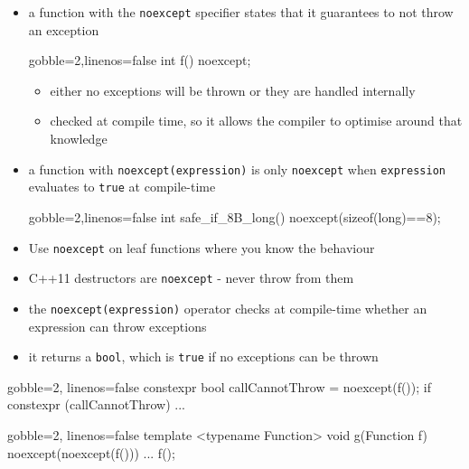 \begin{frame}[fragile]
  \begin{block}{}
    \begin{itemize}
      \item a function with the \texttt{noexcept} specifier states that it guarantees to not throw an exception
      \begin{cppcode*}{gobble=2,linenos=false}
        int f() noexcept;
      \end{cppcode*}
      \begin{itemize}
        \item either no exceptions will be thrown or they are handled internally
        \item checked at compile time, so it allows the compiler to optimise around that knowledge
      \end{itemize}
      \item a function with \texttt{noexcept(expression)} is only \texttt{noexcept} when \texttt{expression} evaluates to \texttt{true} at compile-time
      \begin{cppcode*}{gobble=2,linenos=false}
        int safe_if_8B_long() noexcept(sizeof(long)==8);
      \end{cppcode*}
      \item Use \texttt{noexcept} on leaf functions where you know the behaviour
      \item C++11 destructors are \texttt{noexcept} - never throw from them
    \end{itemize}
  \end{block}
\end{frame}

\begin{frame}[fragile]
  \begin{block}{}
    \begin{itemize}
      \item the \texttt{noexcept(expression)} operator checks at compile-time whether an expression can throw exceptions
      \item it returns a \texttt{bool}, which is \texttt{true} if no exceptions can be thrown
    \end{itemize}
  \end{block}
  \begin{block}{}
    \begin{cppcode*}{gobble=2, linenos=false}
      constexpr bool callCannotThrow = noexcept(f());
      if constexpr (callCannotThrow) { ... }
    \end{cppcode*}
  \end{block}
  \begin{block}{}
    \begin{cppcode*}{gobble=2, linenos=false}
      template <typename Function>
      void g(Function f) noexcept(noexcept(f())) {
        ...
        f();
      }
    \end{cppcode*}
  \end{block}
\end{frame}


